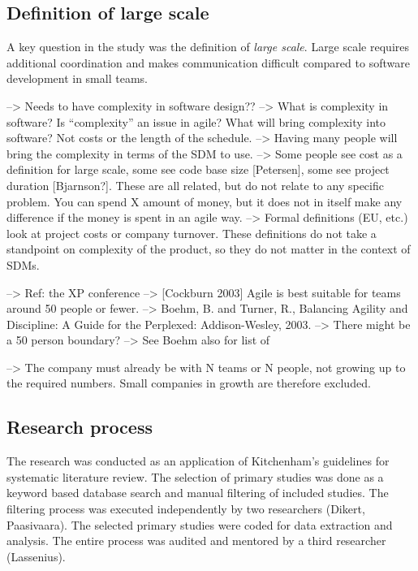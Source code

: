 \documentclass[preprint,authoryear,12pt]{elsarticle}
\begin{document}
\subsection{Definition of large scale}
\label{sec:largescale}

A key question in the study was the definition of \emph{large scale}. Large
scale requires additional coordination and makes communication difficult
compared to software development in small teams.

--> Needs to have complexity in software design?? --> What is complexity in software?
    Is ``complexity'' an issue in agile?
    What will bring complexity into software? Not costs or the length of the
    schedule. --> Having many people will bring the complexity in terms of the
    SDM to use.
--> Some people see cost as a definition for large scale, some see code base
    size [Petersen], some see project duration [Bjarnson?]. These are all
    related, but do not relate to any specific problem. You can spend X amount
    of money, but it does not in itself make any difference if the money is
    spent in an agile way.
--> Formal definitions (EU, etc.) look at project costs or company turnover.
    These definitions do not take a standpoint on complexity of the product, so
    they do not matter in the context of SDMs.

--> Ref: the XP conference
--> [Cockburn 2003] Agile is best suitable for teams around 50 people or fewer.
--> Boehm, B. and Turner, R., Balancing Agility and Discipline: A Guide for the
    Perplexed: Addison-Wesley, 2003. --> There might be a 50 person boundary?
    --> See Boehm also for list of 

--> The company must already be with N teams or N people, not growing up to the
    required numbers. Small companies in growth are therefore excluded. 


\subsection{Research process}

The research was conducted as an application of Kitchenham's
\cite{Kitchenham2007} guidelines for systematic literature review. The selection
of primary studies was done as a keyword based database search and manual
filtering of included studies. The filtering process was executed independently
by two researchers (Dikert, Paasivaara). The selected primary studies were coded
for data extraction and analysis. The entire process was audited and mentored by
a third researcher (Lassenius).
\end{document}
